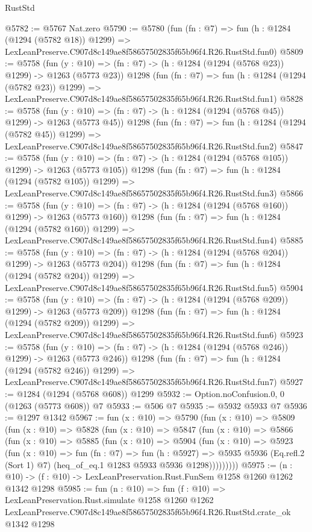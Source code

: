 \begin{lexlean}{RustStd}
\begin{coremodule}
@5782 := @5767 Nat.zero
@5790 := @5780
    (fun (fn : @7) =>
    fun (h : @1284 (@1294 (@5782 @18)) @1299) =>
    LexLeanPreserve.C907d8c149ae8f58657502835f65b96f4.R26.RustStd.fun0)
@5809 := @5758
    (fun (y : @10) => (fn : @7) -> (h : @1284 (@1294 (@5768 @23)) @1299) -> @1263 (@5773 @23))
    @1298
    (fun (fn : @7) =>
    fun (h : @1284 (@1294 (@5782 @23)) @1299) =>
    LexLeanPreserve.C907d8c149ae8f58657502835f65b96f4.R26.RustStd.fun1)
@5828 := @5758
    (fun (y : @10) => (fn : @7) -> (h : @1284 (@1294 (@5768 @45)) @1299) -> @1263 (@5773 @45))
    @1298
    (fun (fn : @7) =>
    fun (h : @1284 (@1294 (@5782 @45)) @1299) =>
    LexLeanPreserve.C907d8c149ae8f58657502835f65b96f4.R26.RustStd.fun2)
@5847 := @5758
    (fun (y : @10) => (fn : @7) -> (h : @1284 (@1294 (@5768 @105)) @1299) -> @1263 (@5773 @105))
    @1298
    (fun (fn : @7) =>
    fun (h : @1284 (@1294 (@5782 @105)) @1299) =>
    LexLeanPreserve.C907d8c149ae8f58657502835f65b96f4.R26.RustStd.fun3)
@5866 := @5758
    (fun (y : @10) => (fn : @7) -> (h : @1284 (@1294 (@5768 @160)) @1299) -> @1263 (@5773 @160))
    @1298
    (fun (fn : @7) =>
    fun (h : @1284 (@1294 (@5782 @160)) @1299) =>
    LexLeanPreserve.C907d8c149ae8f58657502835f65b96f4.R26.RustStd.fun4)
@5885 := @5758
    (fun (y : @10) => (fn : @7) -> (h : @1284 (@1294 (@5768 @204)) @1299) -> @1263 (@5773 @204))
    @1298
    (fun (fn : @7) =>
    fun (h : @1284 (@1294 (@5782 @204)) @1299) =>
    LexLeanPreserve.C907d8c149ae8f58657502835f65b96f4.R26.RustStd.fun5)
@5904 := @5758
    (fun (y : @10) => (fn : @7) -> (h : @1284 (@1294 (@5768 @209)) @1299) -> @1263 (@5773 @209))
    @1298
    (fun (fn : @7) =>
    fun (h : @1284 (@1294 (@5782 @209)) @1299) =>
    LexLeanPreserve.C907d8c149ae8f58657502835f65b96f4.R26.RustStd.fun6)
@5923 := @5758
    (fun (y : @10) => (fn : @7) -> (h : @1284 (@1294 (@5768 @246)) @1299) -> @1263 (@5773 @246))
    @1298
    (fun (fn : @7) =>
    fun (h : @1284 (@1294 (@5782 @246)) @1299) =>
    LexLeanPreserve.C907d8c149ae8f58657502835f65b96f4.R26.RustStd.fun7)
@5927 := @1284 (@1294 (@5768 @608)) @1299
@5932 := Option.noConfusion.{0, 0} (@1263 (@5773 @608)) @7
@5933 := @506 @7
@5935 := @5932 @5933 @7
@5936 := @1297 @1342
@5967 := fun (x : @10) =>
  @5790
    (fun (x : @10) =>
    @5809
      (fun (x : @10) =>
      @5828
        (fun (x : @10) =>
        @5847
          (fun (x : @10) =>
          @5866
            (fun (x : @10) =>
            @5885
              (fun (x : @10) =>
              @5904
                (fun (x : @10) =>
                @5923
                  (fun (x : @10) =>
                  fun (fn : @7) =>
                  fun (h : @5927) =>
                  @5935
                    @5936
                    (Eq.refl.{2} (Sort 1) @7)
                    (heq_of_eq.{1} @1283 @5933 @5936 @1298)))))))))
@5975 := (n : @10) -> (f : @10) -> LexLeanPreservation.Rust.FunSem @1258 @1260 @1262 @1342 @1298
@5985 := fun (n : @10) =>
  fun (f : @10) =>
  LexLeanPreservation.Rust.simulate
    @1258
    @1260
    @1262
    LexLeanPreserve.C907d8c149ae8f58657502835f65b96f4.R26.RustStd.crate_ok
    @1342
    @1298
\end{coremodule}
\end{lexlean}
